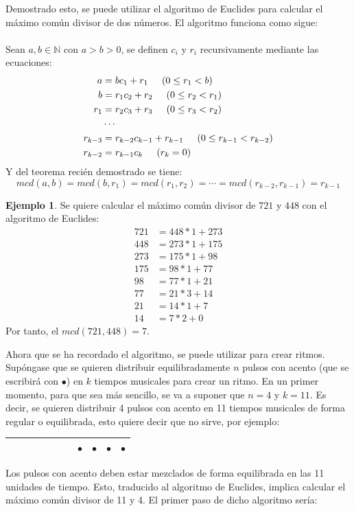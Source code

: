 \documentclass[a4paper, openright, 11pt, titlepage]{report}
\theoremstyle{definition}\newtheorem{defin}[propo]{Definition}
\theoremstyle{definition}\newtheorem{obser}[propo]{Remark}
\theoremstyle{definition}\newtheorem{ejem}[propo]{Ejemplo}
\theoremstyle{definition}\newtheorem{algoritmo}[propo]{Algoritmo}
\begin{document}
Demostrado esto, se puede utilizar el algoritmo de Euclides para calcular el máximo común divisor de dos números. El algoritmo funciona como sigue:\\\\
Sean $a, b \in \mathbb{N}$ con $a>b>0$, se definen $c_{i}$ y $r_{i}$ recursivamente mediante las ecuaciones:
\begin{align*}
    a & = bc_{1} + r_{1} \hspace{0.5cm} (0 \leq r_{1} < b)\\
    b & = r_{1}c_{2} + r_{2} \hspace{0.5cm} (0 \leq r_{2} < r_{1})\\
    r_{1} & = r_{2}c_{3} + r_{3} \hspace{0.5cm} (0 \leq r_{3} < r_{2})\\
    &\cdots\\
    r_{k-3} & = r_{k-2}c_{k-1} + r_{k-1} \hspace{0.5cm} (0 \leq r_{k-1} < r_{k-2})\\
    r_{k-2} & = r_{k-1}c_{k} \hspace{0.5cm} (r_{k} = 0)
\end{align*}
Y del teorema recién demostrado se tiene:
$$mcd(a,b) = mcd(b, r_{1}) = mcd(r_{1}, r_{2}) = \cdots = mcd(r_{k-2}, r_{k-1}) = r_{k-1}$$
\begin{ejem}
Se quiere calcular el máximo común divisor de $721$ y $448$ con el algoritmo de Euclides:
\begin{align*}
    721 &= 448 * 1 + 273\\
    448 &= 273*1 + 175\\
    273 &= 175*1 + 98\\
    175 &= 98*1 + 77\\
    98 &= 77*1 + 21\\
    77 &= 21*3 + 14\\
    21 &= 14*1 + \boxed{7}\\
    14 &= 7*2 + 0
\end{align*}
Por tanto, el $mcd(721, 448) = 7$.
\end{ejem}

Ahora que se ha recordado el algoritmo, se puede utilizar para crear ritmos. Supóngase que se quieren distribuir equilibradamente $n$ pulsos con acento (que se escribirá con $\bullet$) en $k$ tiempos musicales para crear un ritmo. En un primer momento, para que sea más sencillo, se va a suponer que $n = 4$ y $k = 11$. Es decir, se quieren distribuir 4 pulsos con acento en 11 tiempos musicales de forma regular o equilibrada, esto quiere decir que no sirve, por ejemplo:
\begin{table}[H]
    \centering
    \begin{tabular}{|c|c|c|c|c|c|c|c|c|c|c|}
    \hline
         & & & & & & & $\bullet$ & $\bullet$ & $\bullet$ & $\bullet$ \\
        \hline
    \end{tabular}
\end{table}
Los pulsos con acento deben estar mezclados de forma equilibrada en las 11 unidades de tiempo. Esto, traducido al algoritmo de Euclides, implica calcular el máximo común divisor de 11 y 4. El primer paso de dicho algoritmo sería:
\end{document}

